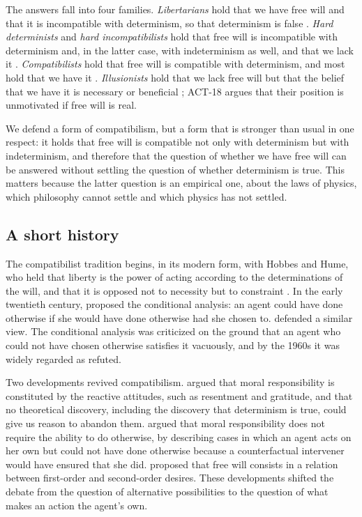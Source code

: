 \documentclass{situationist-preprint}
\begin{document}
The answers fall into four families. \emph{Libertarians} hold that we have free will and that it is incompatible with determinism, so that determinism is false \citep{Kane1996}. \emph{Hard determinists} and \emph{hard incompatibilists} hold that free will is incompatible with determinism and, in the latter case, with indeterminism as well, and that we lack it \citep{Pereboom2001}. \emph{Compatibilists} hold that free will is compatible with determinism, and most hold that we have it \citep{FischerRavizza1998,Vihvelin2013,List2019}. \emph{Illusionists} hold that we lack free will but that the belief that we have it is necessary or beneficial \citep{Smilansky2000}; ACT-18 argues that their position is unmotivated if free will is real.

We defend a form of compatibilism, but a form that is stronger than usual in one respect: it holds that free will is compatible not only with determinism but with indeterminism, and therefore that the question of whether we have free will can be answered without settling the question of whether determinism is true. This matters because the latter question is an empirical one, about the laws of physics, which philosophy cannot settle and which physics has not settled.

\subsection{A short history}

The compatibilist tradition begins, in its modern form, with Hobbes and Hume, who held that liberty is the power of acting according to the determinations of the will, and that it is opposed not to necessity but to constraint \citep{Hume1748}. In the early twentieth century, \citet{Moore1912} proposed the conditional analysis: an agent could have done otherwise if she would have done otherwise had she chosen to. \citet{Ayer1954} defended a similar view. The conditional analysis was criticized on the ground that an agent who could not have chosen otherwise satisfies it vacuously, and by the 1960s it was widely regarded as refuted.

Two developments revived compatibilism. \citet{Strawson1962} argued that moral responsibility is constituted by the reactive attitudes, such as resentment and gratitude, and that no theoretical discovery, including the discovery that determinism is true, could give us reason to abandon them. \citet{Frankfurt1969} argued that moral responsibility does not require the ability to do otherwise, by describing cases in which an agent acts on her own but could not have done otherwise because a counterfactual intervener would have ensured that she did. \citet{Frankfurt1971} proposed that free will consists in a relation between first-order and second-order desires. These developments shifted the debate from the question of alternative possibilities to the question of what makes an action the agent's own.
\end{document}
